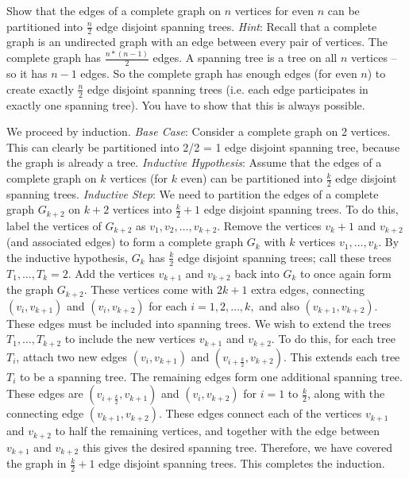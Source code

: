 \question Show that the edges of a complete graph on $n$ vertices 
for even $n$ can be partitioned into $\frac{n}{2}$ edge disjoint 
spanning trees. \newline
\textit{Hint}: Recall that a complete graph is an undirected graph 
with an edge between every pair of vertices. The complete graph has 
$\frac{n * (n-1)}{2}$ edges. A spanning tree is a tree on all $n$ 
vertices -- so it has $n-1$ edges. So the complete graph has enough 
edges (for even $n$) to create exactly $\frac{n}{2}$ edge disjoint 
spanning trees (i.e. each edge participates in exactly one spanning 
tree). You have to show that this is always possible.

\begin{solution}[2in]
We proceed by induction.\newline
\textit{Base Case}: Consider a complete graph on 2 vertices. This 
can clearly be partitioned into 2/2 = 1 edge disjoint spanning tree, 
because the graph is already a tree.\newline
\textit{Inductive Hypothesis}: Assume that the edges of a complete 
graph on $k$ vertices (for $k$ even) can be partitioned into 
$\frac{k}{2}$ edge disjoint spanning trees.\newline
\textit{Inductive Step}: We need to partition the edges of a 
complete graph $G_{k+2}$ on $k+2$ vertices into $\frac{k}{2} +1$ 
edge disjoint spanning trees.\newline
To do this, label the vertices of $G_{k+2}$ as $v_1, v_2, \dotsc ,v_{k+2}$. 
Remove the vertices $v_k+1$ and $v_{k+2}$ (and associated edges) to 
form a complete graph $G_k$ with $k$ vertices $v_1, \dotsc, v_k$. 
By the inductive hypothesis, $G_k$ has $\frac{k}{2}$ edge disjoint 
spanning trees; call these trees $T_1, \dotsc ,T_k=2$.
Add the vertices $v_{k+1}$ and $v_{k+2}$ back into $G_k$ to once 
again form the graph $G_{k+2}$. These vertices come with $2k+1$ 
extra edges, connecting $(v_i,v_{k+1})$ and $(v_i,v_{k+2})$ for 
each $i = 1,2,\dotsc,k,$ and also
$(v_{k+1}, v_{k+2})$. These edges must be included into spanning trees.
We wish to extend the trees $T_1,\dotsc,T_{k+2}$ to include the new 
vertices $v_{k+1}$ and $v_{k+2}$. To do this, for each tree $T_i$, 
attach two new edges $(v_i,v_{k+1})$ and $(v_{i+\frac{k}{2}}, v_{k+2})$. 
This extends each tree $T_i$ to be a spanning tree.
The remaining edges form one additional spanning tree. These edges 
are $(v_{i+\frac{k}{2}}, v_{k+1})$ and $(v_i,v_{k+2})$ for $i =1$ to 
$\frac{k}{2}$, along with the connecting edge $(v_{k+1}, v_{k+2})$. 
These edges connect each of the vertices $v_{k+1}$ and $v_{k+2}$ to 
half the remaining vertices, and together with the edge between 
$v_{k+1}$ and $v_{k+2}$ this gives the desired spanning tree.
Therefore, we have covered the graph in $\frac{k}{2} +1$ edge disjoint 
spanning trees. This completes the induction.\newline


\end{solution}
